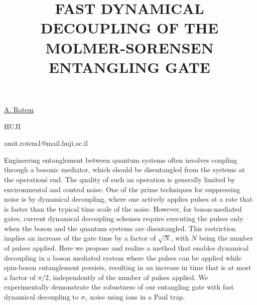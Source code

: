 \title{FAST DYNAMICAL DECOUPLING OF THE MOLMER-SORENSEN ENTANGLING GATE}

\underline{A. Rotem}  

{\normalsize{\vspace{-4mm}
HUJI



\email amit.rotem1@mail.huji.ac.il}}

Engineering entanglement between quantum systems often involves coupling through a bosonic mediator, which should be disentangled from the systems at the operation\'s end. The quality of such an operation is generally limited by environmental and control noise. One of the prime techniques for suppressing noise is by dynamical decoupling, where one actively applies pulses at a rate that is faster than the typical time scale of the noise.  However, for boson-mediated gates, current dynamical decoupling schemes require executing the pulses only when the boson and the quantum systems are disentangled. This restriction implies an increase of the gate time by a factor of $\sqrt{N}$, with $N$ being the number of pulses applied. Here we propose and realize a method that enables dynamical decoupling in a boson mediated system where the pulses can be applied while spin-boson entanglement persists, resulting in an increase in time that is at most a factor of $\pi/2$, independently of the number of pulses applied. We experimentally demonstrate the robustness of our entangling gate with fast dynamical decoupling to $\sigma_z$ noise using ions in a Paul trap.

\vspace{\baselineskip}